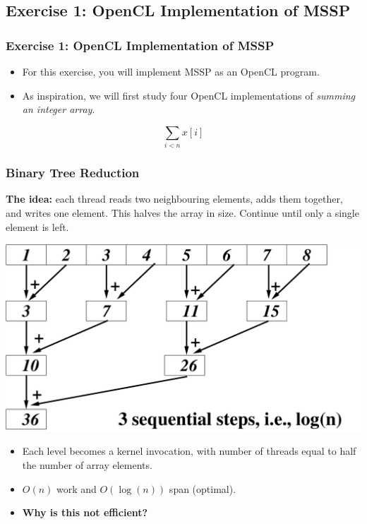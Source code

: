 \documentclass{beamer}
\begin{document}
\subsection{Exercise 1: OpenCL Implementation of MSSP}

\begin{frame}[fragile,t]
  \frametitle{Exercise 1: OpenCL Implementation of MSSP}

  \begin{itemize}
  \item For this exercise, you will implement MSSP as an OpenCL program.
  \item As inspiration, we will first study four OpenCL
    implementations of \textit{summing an integer array}.
  \end{itemize}

\huge
  \[
    \sum_{i < n} x[i]
  \]

\end{frame}

\begin{frame}
  \frametitle{Binary Tree Reduction}

  \textbf{The idea:} each thread reads two neighbouring elements, adds
  them together, and writes one element.  This halves the array in
  size.  Continue until only a single element is left.

\begin{center}
  \includegraphics[height=20ex]{img/day3/ReduceEg.pdf}
\end{center}

\begin{itemize}
\item Each level becomes a kernel invocation, with number of threads
  equal to half the number of array elements.
\item $O(n)$ work and $O(\log(n))$ span (optimal).
\item \textbf{Why is this not efficient?}
\end{itemize}

\end{frame}
\end{document}
